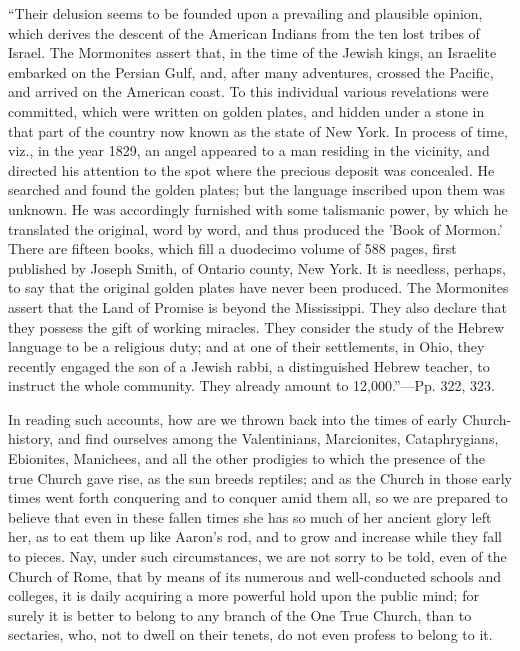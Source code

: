 ``Their
delusion seems to be founded upon a prevailing and plausible opinion,
which derives the descent of the American Indians from the ten lost
tribes of Israel. The Mormonites assert that, in the time of the
Jewish kings, an Israelite embarked on the Persian Gulf, and, after
many adventures, crossed the Pacific, and arrived on the American
coast. To this individual various revelations were committed, which
were written on golden plates, and hidden under a stone in that part
of the country now known as the state of New York. In process of time,
viz., in the year 1829, an angel appeared to a man residing in the
vicinity, and directed his attention
to the spot where the precious deposit was concealed. He searched and
found the golden plates; but the language inscribed upon them was
unknown. He was accordingly furnished with some talismanic power, by
which he translated the original, word by word, and thus produced the
'Book of Mormon.' There are fifteen books, which fill a duodecimo
volume of 588 pages, first published by Joseph Smith, of Ontario
county, New York. It is needless, perhaps, to say that the original
golden plates have never been produced. The Mormonites assert that the
Land of Promise is beyond the Mississippi. They also declare that they
possess the gift of working miracles. They consider the study of the
Hebrew language to be a religious duty; and at one of their
settlements, in Ohio, they recently engaged the son of a Jewish rabbi,
a distinguished Hebrew teacher, to instruct the whole community. They
already amount to 12,000.''—Pp. 322, 323.

In reading such accounts, how are we thrown back
into the times of early Church-history, and find ourselves among the
Valentinians, Marcionites, Cataphrygians, Ebionites, Manichees, and
all the other prodigies to which the presence of the true Church gave
rise, as the sun breeds reptiles; and as the Church in those early
times went forth conquering and to conquer amid them all, so we are
prepared to believe that even in these fallen times she has so much of
her ancient glory left her, as to eat them up like Aaron's rod, and to
grow and increase while they fall to pieces. Nay, under such
circumstances, we are not sorry to be told, even of the Church of
Rome, that by means of its numerous and well-conducted schools and
colleges, it is daily acquiring a more powerful hold upon the public
mind; for surely it is better to belong to any branch of the One True
Church, than to sectaries, who, not to dwell on their tenets, do not
even profess to belong to it.

